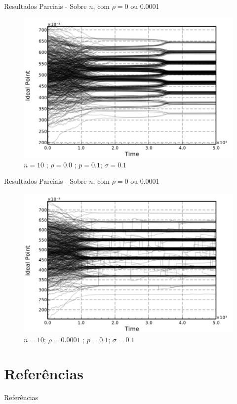 \documentclass{beamer}
\begin{document}
\begin{frame}{Resultados Parciais - Sobre \(n\), com \(\rho = 0 \) ou 0.0001}
  \begin{figure}[H]
    \centering
    \includegraphics[scale = 0.5]{ims/n10p(01)sigma(01)rho(00).pdf}
    \caption{\(n = 10\) ; \(\rho = 0.0\)  ; \(p = 0.1\); \(\sigma = 0.1\) }
  \end{figure}
\end{frame}

\begin{frame}{Resultados Parciais - Sobre \(n\), com \(\rho = 0 \) ou 0.0001}
  \begin{figure}[H]
    \centering
    \includegraphics[scale = 0.5]{ims/n10p(01)sigma(01)rho(00001).pdf}
    \caption{ \(n = 10 \); \(\rho = 0.0001\)  ; \(p = 0.1\); \(\sigma = 0.1\) }
  \end{figure}
\end{frame}




\section*{Referências}
\begin{frame}[allowframebreaks]{Referências}
\printbibliography[heading=none]
\end{frame}
\end{document}
